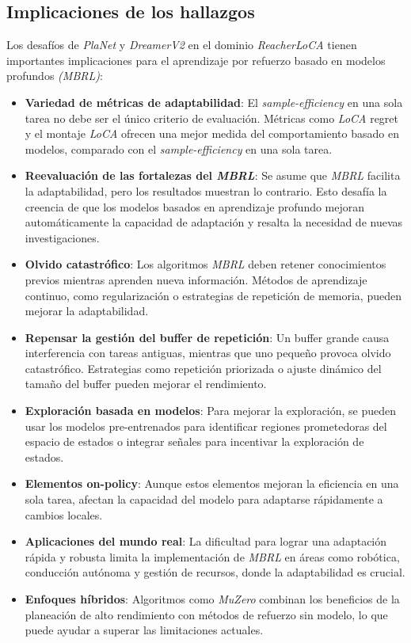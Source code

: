 \subsection{Implicaciones de los hallazgos}\label{subsec:implicaciones-de-los-hallazgos}

Los desafíos de \textit{PlaNet} y \textit{DreamerV2} en el dominio \textit{ReacherLoCA} tienen importantes implicaciones para el aprendizaje por refuerzo basado en modelos profundos \textit{(MBRL)}:

\begin{itemize}
    \item \textbf{Variedad de métricas de adaptabilidad}: El \textit{sample-efficiency} en una sola tarea no debe ser el único criterio de evaluación.
    Métricas como \textit{LoCA} regret y el montaje \textit{LoCA} ofrecen una mejor medida del comportamiento basado en modelos, comparado con el \textit{sample-efficiency} en una sola tarea.
    \item \textbf{Reevaluación de las fortalezas del \textit{MBRL}}: Se asume que \textit{MBRL} facilita la adaptabilidad, pero los resultados muestran lo contrario.
    Esto desafía la creencia de que los modelos basados en aprendizaje profundo mejoran automáticamente la capacidad de adaptación y resalta la necesidad de nuevas investigaciones.
    \item \textbf{Olvido catastrófico}: Los algoritmos \textit{MBRL} deben retener conocimientos previos mientras aprenden nueva información.
    Métodos de aprendizaje continuo, como regularización o estrategias de repetición de memoria, pueden mejorar la adaptabilidad.
    \item \textbf{Repensar la gestión del buffer de repetición}: Un buffer grande causa interferencia con tareas antiguas, mientras que uno pequeño provoca olvido catastrófico.
    Estrategias como repetición priorizada o ajuste dinámico del tamaño del buffer pueden mejorar el rendimiento.
    \item \textbf{Exploración basada en modelos}: Para mejorar la exploración, se pueden usar los modelos pre-entrenados para identificar regiones prometedoras del espacio de estados o integrar señales para incentivar la exploración de estados.
    \item \textbf{Elementos on-policy}: Aunque estos elementos mejoran la eficiencia en una sola tarea, afectan la capacidad del modelo para adaptarse rápidamente a cambios locales.
    \item \textbf{Aplicaciones del mundo real}: La dificultad para lograr una adaptación rápida y robusta limita la implementación de \textit{MBRL} en áreas como robótica, conducción autónoma y gestión de recursos, donde la adaptabilidad es crucial.
    \item \textbf{Enfoques híbridos}: Algoritmos como \textit{MuZero} combinan los beneficios de la planeación de alto rendimiento con métodos de refuerzo sin modelo, lo que puede ayudar a superar las limitaciones actuales.
\end{itemize}


